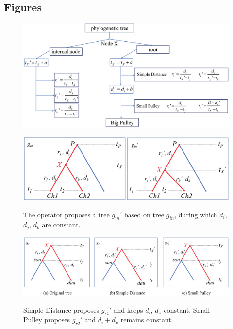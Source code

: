 \documentclass{bmcart}
\begin{document}
\begin{backmatter}

\section*{Figures}
\begin{figure}[h!]
\includegraphics[width=12cm]{flowchart.eps}\\
\caption{}
\label{flowchart}
\end{figure}

\begin{figure}[h!]
\includegraphics[width=12cm]{internalnodes.eps}\\
\caption{
             The operator proposes a tree ${g_{in}}'$ based on tree $g_{in}$, during which $d_i$, $d_j$, $d_k$ are constant.}
\label{internalnodes}
\end{figure}

\begin{figure}[h!]
\includegraphics[width=12cm]{rootstrategy.eps}\\
\caption{
             Simple Distance proposes ${g_{r1}}'$ and keeps $d_i$, $d_x$ constant. Small Pulley proposes ${g_{r2}}'$ and ${d_i} + {d_x}$ remains constant.}
\label{simpledistance}
\end{figure}



\end{backmatter}
\end{document}
